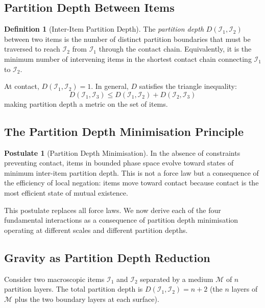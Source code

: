 \documentclass[11pt,twocolumn,a4paper]{article}
\theoremstyle{plain}
\theoremstyle{definition}
\newtheorem{definition}[theorem]{Definition}
\newtheorem{postulate}[theorem]{Postulate}
\theoremstyle{remark}
\begin{document}
\subsection{Partition Depth Between Items}
\label{subsec:depth_between}

\begin{definition}[Inter-Item Partition Depth]
\label{def:inter_depth}
The \emph{partition depth} $D(\mathcal{I}_1, \mathcal{I}_2)$ between two items
is the number of distinct partition boundaries that must be traversed to reach
$\mathcal{I}_2$ from $\mathcal{I}_1$ through the contact chain. Equivalently,
it is the minimum number of intervening items in the shortest contact chain
connecting $\mathcal{I}_1$ to $\mathcal{I}_2$.
\end{definition}

At contact, $D(\mathcal{I}_1, \mathcal{I}_2) = 1$. In general, $D$ satisfies
the triangle inequality:
\begin{equation}
    D(\mathcal{I}_1, \mathcal{I}_3) \leq D(\mathcal{I}_1, \mathcal{I}_2) +
    D(\mathcal{I}_2, \mathcal{I}_3)
    \label{eq:triangle}
\end{equation}
making partition depth a metric on the set of items.

\subsection{The Partition Depth Minimisation Principle}
\label{subsec:pdm}

\begin{postulate}[Partition Depth Minimisation]
\label{post:pdm}
In the absence of constraints preventing contact, items in bounded phase space
evolve toward states of minimum inter-item partition depth. This is not a
force law but a consequence of the efficiency of local negation: items move
toward contact because contact is the most efficient state of mutual existence.
\end{postulate}

This postulate replaces all force laws. We now derive each of the four
fundamental interactions as a consequence of partition depth minimisation
operating at different scales and different partition depths.

\subsection{Gravity as Partition Depth Reduction}
\label{subsec:gravity}

Consider two macroscopic items $\mathcal{I}_1$ and $\mathcal{I}_2$ separated by
a medium $\mathcal{M}$ of $n$ partition layers. The total partition depth is
$D(\mathcal{I}_1, \mathcal{I}_2) = n + 2$ (the $n$ layers of $\mathcal{M}$
plus the two boundary layers at each surface).
\end{document}
